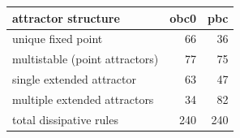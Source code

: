 \begin{tabular}{@{}l rr@{}}
\toprule
attractor structure & obc0 & pbc \\
\midrule
unique fixed point & 66 & 36 \\
multistable (point attractors) & 77 & 75 \\
single extended attractor & 63 & 47 \\
multiple extended attractors & 34 & 82 \\
\midrule
total dissipative rules & 240 & 240 \\
\bottomrule
\end{tabular}
